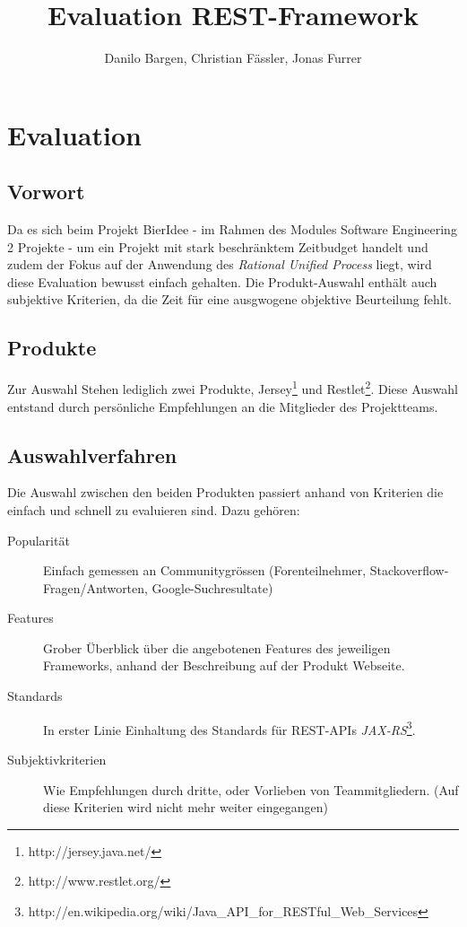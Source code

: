 \documentclass[10pt,a4paper]{scrartcl}
\author{Danilo Bargen, Christian Fässler, Jonas Furrer}
\title{Evaluation REST-Framework}
\begin{document}
\begin{titlepage}
	\maketitle
	\vspace{120mm}
	\thispagestyle{empty} %
\end{titlepage}

\section{Evaluation}
\subsection{Vorwort}
Da es sich beim Projekt BierIdee - im Rahmen des Modules Software Engineering 2 Projekte - um ein Projekt mit stark beschränktem Zeitbudget handelt und zudem der Fokus auf der Anwendung des \textit{Rational Unified Process} liegt, wird diese Evaluation bewusst einfach gehalten. Die Produkt-Auswahl enthält auch subjektive Kriterien, da die Zeit für eine ausgwogene objektive Beurteilung fehlt.

\subsection{Produkte}
Zur Auswahl Stehen lediglich zwei Produkte, Jersey\footnote{http://jersey.java.net/} und Restlet\footnote{http://www.restlet.org/}. Diese Auswahl entstand durch persönliche Empfehlungen an die Mitglieder des Projektteams.

\subsection{Auswahlverfahren}
Die Auswahl zwischen den beiden Produkten passiert anhand von Kriterien die einfach und schnell zu evaluieren sind. Dazu gehören:

\begin{description}
	\item[Popularität]Einfach gemessen an Communitygrössen (Forenteilnehmer, Stackoverflow-Fragen/Antworten, Google-Suchresultate)
	\item[Features]Grober Überblick über die angebotenen Features des jeweiligen Frameworks, anhand der Beschreibung auf der Produkt Webseite.
	\item[Standards]In erster Linie Einhaltung des Standards für REST-APIs \textit{JAX-RS}\footnote{http://en.wikipedia.org/wiki/Java\_API\_for\_RESTful\_Web\_Services}.
	\item[Subjektivkriterien]Wie Empfehlungen durch dritte, oder Vorlieben von Teammitgliedern. (Auf diese Kriterien wird nicht mehr weiter eingegangen)
\end{description}
\end{document}
